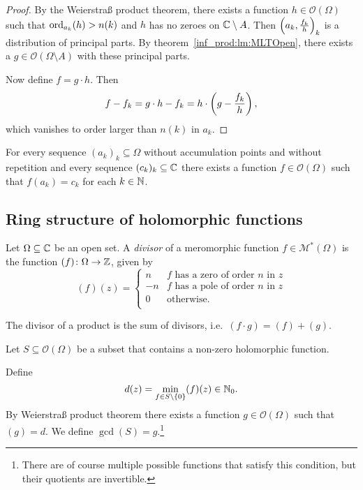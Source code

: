 \begin{proof}
By the Weierstraß product theorem, there exists a function
$h \in \mathcal{O}(\Omega)$ such that $\operatorname{ord}_{a_k}(h) > n(k)$ and
$h$ has no zeroes on $\mathbb{C} \setminus A$. Then
$\left(a_k, \frac{f_k}{h}\right)_k$ is a distribution of principal parts.
By theorem~\ref{inf_prod:lm:MLTOpen}, there exists a
$g \in \mathcal{O}(\Omega \setminus A)$ with these principal parts.

Now define $f = g \cdot h$. Then
\[
f - f_k = g \cdot h - f_k = h \cdot \left(g - \frac{f_k}{h}\right),
\]
which vanishes to order larger than $n(k)$ in $a_k$.
\end{proof}

\begin{posledica}
For every sequence $(a_k)_k \subseteq \Omega$ without accumulation
points and without repetition and every sequence
$(c_k)_k \subseteq \mathbb{C}$ there exists a function
$f \in \mathcal{O}(\Omega)$ such that $f(a_k) = c_k$ for each
$k \in \mathbb{N}$.
\end{posledica}

\newpage

\subsection{Ring structure of holomorphic functions}

\begin{definicija}
Let $\Omega \subseteq \mathbb{C}$ be an open set. A
\emph{divisor} of a meromorphic function
$f \in \mathcal{M}^*(\Omega)$ is the function
$(f) \colon \Omega \to \mathbb{Z}$, given by
\[
(f)(z) = \begin{cases}
 n & \text{$f$ has a zero of order $n$ in $z$} \\
-n & \text{$f$ has a pole of order $n$ in $z$} \\
 0 & \text{otherwise}.                         \\
\end{cases}
\]
\end{definicija}

\begin{opomba}
The divisor of a product is the sum of divisors,
i.e.~$(f \cdot g) = (f) + (g)$.
\end{opomba}

\begin{definicija}
Let $S \subseteq \mathcal{O}(\Omega)$ be a subset that contains a
non-zero holomorphic function.

Define
\[
d(z) = \min_{f \in S \setminus \left\{0\right\}} (f)(z) \in \mathbb{N}_0.
\]
By Weierstraß product theorem there exists a function
$g \in \mathcal{O}(\Omega)$ such that $(g) = d$. We define
$\gcd(S) = g$.\footnote{There are of
course multiple possible functions that satisfy this condition, but
their quotients are invertible.}
\end{definicija}

